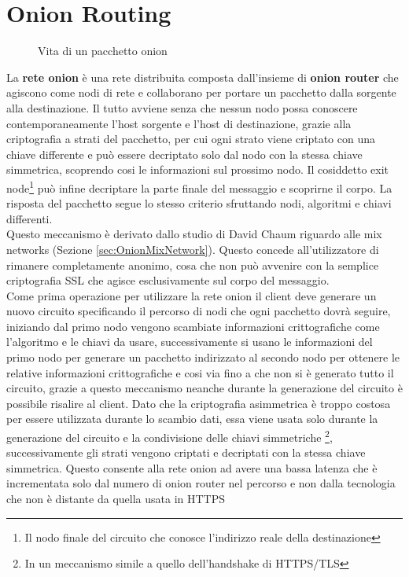 \chapter{Onion Routing}
\label{chap:Capitolo1}

\begin{figure}[htpb!]
    \centering
    
    \caption{Vita di un pacchetto onion}
    \label{fig:routing}
\end{figure}

La \textbf{rete onion} è una rete distribuita composta dall'insieme di \textbf{onion router} che agiscono come nodi di rete e collaborano per portare un pacchetto dalla sorgente alla destinazione. 
Il tutto avviene senza che nessun nodo possa conoscere contemporaneamente l'host sorgente e l'host di destinazione, grazie alla criptografia a strati del pacchetto, per cui ogni strato viene criptato con una chiave differente e può essere decriptato solo dal nodo con la stessa chiave simmetrica, scoprendo cosi le informazioni sul prossimo nodo. 
Il cosiddetto exit node\footnote{Il nodo finale del circuito che conosce l'indirizzo reale della destinazione} può infine decriptare la parte finale del messaggio e scoprirne il corpo. 
La risposta del pacchetto segue lo stesso criterio sfruttando nodi, algoritmi e chiavi differenti. \\
Questo meccanismo è derivato dallo studio di David Chaum riguardo alle mix networks (Sezione \ref{sec:OnionMixNetwork}).
Questo concede all'utilizzatore di rimanere completamente anonimo, cosa che non può avvenire con la semplice criptografia SSL che agisce esclusivamente sul corpo del messaggio. \\
Come prima operazione per utilizzare la rete onion il client deve generare un nuovo circuito specificando il percorso di nodi che ogni pacchetto dovrà seguire, iniziando dal primo nodo vengono scambiate informazioni crittografiche come l'algoritmo e le chiavi da usare, successivamente si usano le informazioni del primo nodo per generare un pacchetto indirizzato al secondo nodo per ottenere le relative informazioni crittografiche e cosi via fino a che non si è generato tutto il circuito, grazie a questo meccanismo neanche durante la generazione del circuito è possibile risalire al client. 
Dato che la criptografia asimmetrica è troppo costosa per essere utilizzata durante lo scambio dati, essa viene usata solo durante la generazione del circuito e la condivisione delle chiavi simmetriche \footnote{In un meccanismo simile a quello dell'handshake di HTTPS/TLS}, successivamente gli strati vengono criptati e decriptati con la stessa chiave simmetrica. 
Questo consente alla rete onion ad avere una bassa latenza che è incrementata solo dal numero di onion router nel percorso e non dalla tecnologia che non è distante da quella usata in HTTPS 
\cite{OnionRouting}

